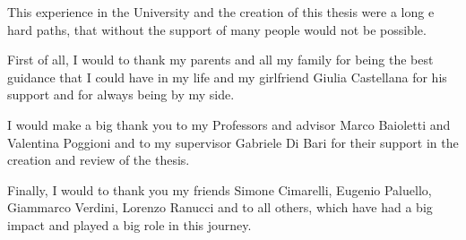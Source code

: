 This experience in the University and the creation of this thesis were a long e hard paths, that without the support of many people would not be possible.

First of all, I would to thank my parents and all my family for being the best guidance that I could have in my life and my girlfriend Giulia Castellana for his support and for always being by my side.

I would make a big thank you to my Professors and advisor Marco Baioletti and Valentina Poggioni and to my supervisor Gabriele Di Bari for their support in the creation and review of the thesis.

Finally, I would to thank you my friends Simone Cimarelli, Eugenio Paluello, Giammarco Verdini, Lorenzo Ranucci and to all others, which have had a big impact and played a big role in this journey.